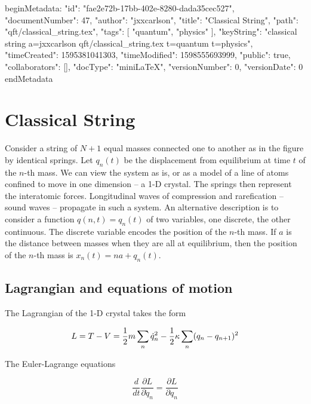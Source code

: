 beginMetadata:
{
    "id": "fae2e72b-17bb-402e-8280-dada35cec527",
    "documentNumber": 47,
    "author": "jxxcarlson",
    "title": "Classical String",
    "path": "qft/classical_string.tex",
    "tags": [
        "quantum",
        "physics"
    ],
    "keyString": "classical string a=jxxcarlson qft/classical_string.tex t=quantum t=physics",
    "timeCreated": 1595381041303,
    "timeModified": 1598555693999,
    "public": true,
    "collaborators": [],
    "docType": "miniLaTeX",
    "versionNumber": 0,
    "versionDate": 0
}
endMetadata
\setcounter{section}{15}

\section{Classical String}

\innertableofcontents

Consider a string of $N+1$ equal masses connected one to another as in the figure by identical springs.  Let $q_n(t)$ be the displacement from equilibrium at time $t$ of the $n$-th mass.  We can view the system as is, or as a model of a line of atoms confined to move in one dimension -- a 1-D crystal.  The springs then represent the interatomic forces.  Longitudinal waves of compression and rarefication -- sound waves -- propagate in such a system.  An alternative description is to consider a function $q(n,t) = q_n(t)$ of two variables, one discrete, the other continuous.  The discrete variable encodes the position of the $n$-th mass.  If $a$ is the distance between masses when they are all at equilibrium, then the position of the $n$-th mass is $x_n(t) = na + q_n(t)$. 
  




\subsection{ Lagrangian and equations of motion}

The Lagrangian of the 1-D crystal takes the form

\begin{equation}
L = T - V = \small{\frac{1}{2}} m \sum_n \dot q_n^2 - \small{\frac{1}{2}} \kappa \sum_n (q_n - q_{n+1})^2
\end{equation}

The Euler-Lagrange equations

\begin{equation}
\frac{d}{dt} \frac{\partial L}{\partial \dot q_n}
=  \frac{\partial L}{\partial q_n}
\end{equation}

